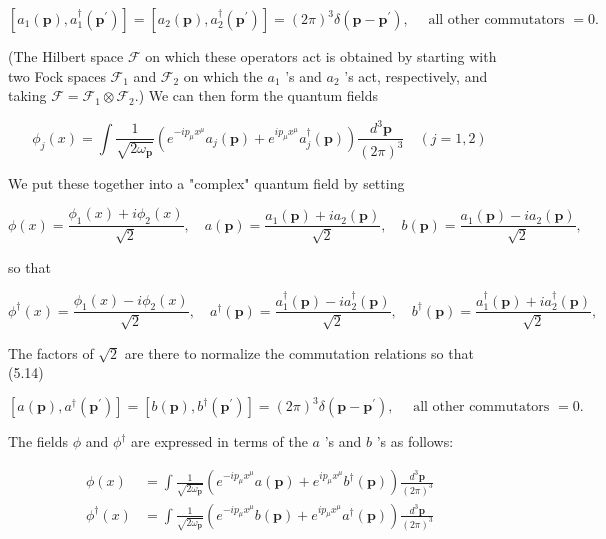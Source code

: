 \documentclass[10pt, letterpaper]{article}
\begin{document}
$$
\left[a_{1}(\mathbf{p}), a_{1}^{\dagger}\left(\mathbf{p}^{\prime}\right)\right]=\left[a_{2}(\mathbf{p}), a_{2}^{\dagger}\left(\mathbf{p}^{\prime}\right)\right]=(2 \pi)^{3} \delta\left(\mathbf{p}-\mathbf{p}^{\prime}\right), \quad \text { all other commutators }=0 .
$$

(The Hilbert space $\mathcal{F}$ on which these operators act is obtained by starting with two Fock spaces $\mathcal{F}_{1}$ and $\mathcal{F}_{2}$ on which the $a_{1}$ 's and $a_{2}$ 's act, respectively, and taking $\mathcal{F}=\mathcal{F}_{1} \otimes \mathcal{F}_{2}$.) We can then form the quantum fields

$$
\phi_{j}(x)=\int \frac{1}{\sqrt{2 \omega_{\mathbf{p}}}}\left(e^{-i p_{\mu} x^{\mu}} a_{j}(\mathbf{p})+e^{i p_{\mu} x^{\mu}} a_{j}^{\dagger}(\mathbf{p})\right) \frac{d^{3} \mathbf{p}}{(2 \pi)^{3}} \quad(j=1,2)
$$

We put these together into a "complex" quantum field by setting

$$
\phi(x)=\frac{\phi_{1}(x)+i \phi_{2}(x)}{\sqrt{2}}, \quad a(\mathbf{p})=\frac{a_{1}(\mathbf{p})+i a_{2}(\mathbf{p})}{\sqrt{2}}, \quad b(\mathbf{p})=\frac{a_{1}(\mathbf{p})-i a_{2}(\mathbf{p})}{\sqrt{2}},
$$

so that

$$
\phi^{\dagger}(x)=\frac{\phi_{1}(x)-i \phi_{2}(x)}{\sqrt{2}}, \quad a^{\dagger}(\mathbf{p})=\frac{a_{1}^{\dagger}(\mathbf{p})-i a_{2}^{\dagger}(\mathbf{p})}{\sqrt{2}}, \quad b^{\dagger}(\mathbf{p})=\frac{a_{1}^{\dagger}(\mathbf{p})+i a_{2}^{\dagger}(\mathbf{p})}{\sqrt{2}},
$$

The factors of $\sqrt{2}$ are there to normalize the commutation relations so that (5.14)

$$
\left[a(\mathbf{p}), a^{\dagger}\left(\mathbf{p}^{\prime}\right)\right]=\left[b(\mathbf{p}), b^{\dagger}\left(\mathbf{p}^{\prime}\right)\right]=(2 \pi)^{3} \delta\left(\mathbf{p}-\mathbf{p}^{\prime}\right), \quad \text { all other commutators }=0 .
$$

The fields $\phi$ and $\phi^{\dagger}$ are expressed in terms of the $a$ 's and $b$ 's as follows:

$$
\begin{aligned}
\phi(x) & =\int \frac{1}{\sqrt{2 \omega_{\mathbf{p}}}}\left(e^{-i p_{\mu} x^{\mu}} a(\mathbf{p})+e^{i p_{\mu} x^{\mu}} b^{\dagger}(\mathbf{p})\right) \frac{d^{3} \mathbf{p}}{(2 \pi)^{3}} \\
\phi^{\dagger}(x) & =\int \frac{1}{\sqrt{2 \omega_{\mathbf{p}}}}\left(e^{-i p_{\mu} x^{\mu}} b(\mathbf{p})+e^{i p_{\mu} x^{\mu}} a^{\dagger}(\mathbf{p})\right) \frac{d^{3} \mathbf{p}}{(2 \pi)^{3}}
\end{aligned}
$$
\end{document}
